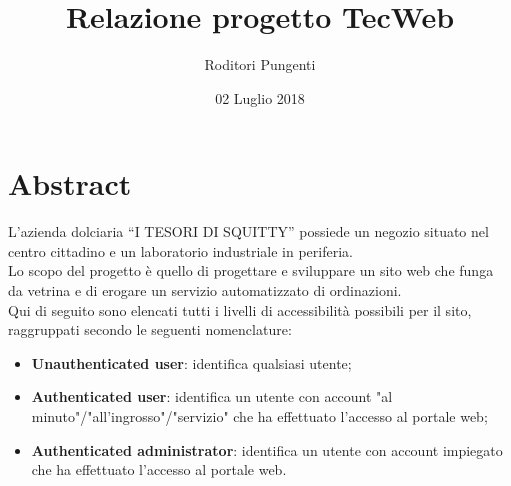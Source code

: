 



\title{\textbf{Relazione progetto TecWeb}}
\author{Roditori Pungenti}

\date{02 Luglio 2018}




\makeFrontPage

\tableofcontents

\newpage

\section{Abstract}

L’azienda dolciaria “I TESORI DI SQUITTY” possiede un negozio situato nel centro cittadino e un laboratorio industriale in periferia.\\
Lo scopo del progetto è quello di progettare e sviluppare un sito web che funga da vetrina e di erogare un servizio automatizzato di ordinazioni.\\

Qui di seguito sono elencati tutti i livelli di accessibilità possibili per il sito, raggruppati secondo le seguenti nomenclature:
\begin{itemize}
	\item \textbf{Unauthenticated user}: identifica qualsiasi utente;
	\item \textbf{Authenticated user}: identifica un utente con account "al minuto"/"all'ingrosso"/"servizio" che ha effettuato l'accesso al portale web;
	\item \textbf{Authenticated administrator}: identifica un utente con account impiegato che ha effettuato l'accesso al portale web.
\end{itemize}


